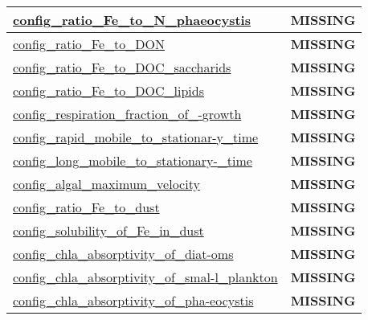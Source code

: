 {\begin{center}
\begin{longtable}{| p{2.0in} || p{4.0in} |}
    \hline
    \hyperref[subsec:nm_sec_config_ratio_Fe_to_N_phaeocystis]{config\_ratio\_Fe\_to\_N\_phaeocystis} & {\bf \color{red} MISSING} \\
    \hline
    \hyperref[subsec:nm_sec_config_ratio_Fe_to_DON]{config\_ratio\_Fe\_to\_DON} & {\bf \color{red} MISSING} \\
    \hline
    \hyperref[subsec:nm_sec_config_ratio_Fe_to_DOC_saccharids]{config\_ratio\_Fe\_to\_DOC\_saccharids} & {\bf \color{red} MISSING} \\
    \hline
    \hyperref[subsec:nm_sec_config_ratio_Fe_to_DOC_lipids]{config\_ratio\_Fe\_to\_DOC\_lipids} & {\bf \color{red} MISSING} \\
    \hline
    \hyperref[subsec:nm_sec_config_respiration_fraction_of_growth]{config\_respiration\_fraction\_of\_-}\hyperref[subsec:nm_sec_config_respiration_fraction_of_growth]{growth}& {\bf \color{red} MISSING} \\
    \hline
    \hyperref[subsec:nm_sec_config_rapid_mobile_to_stationary_time]{config\_rapid\_mobile\_to\_stationar-}\hyperref[subsec:nm_sec_config_rapid_mobile_to_stationary_time]{y\_time}& {\bf \color{red} MISSING} \\
    \hline
    \hyperref[subsec:nm_sec_config_long_mobile_to_stationary_time]{config\_long\_mobile\_to\_stationary-}\hyperref[subsec:nm_sec_config_long_mobile_to_stationary_time]{\_time}& {\bf \color{red} MISSING} \\
    \hline
    \hyperref[subsec:nm_sec_config_algal_maximum_velocity]{config\_algal\_maximum\_velocity} & {\bf \color{red} MISSING} \\
    \hline
    \hyperref[subsec:nm_sec_config_ratio_Fe_to_dust]{config\_ratio\_Fe\_to\_dust} & {\bf \color{red} MISSING} \\
    \hline
    \hyperref[subsec:nm_sec_config_solubility_of_Fe_in_dust]{config\_solubility\_of\_Fe\_in\_dust} & {\bf \color{red} MISSING} \\
    \hline
    \hyperref[subsec:nm_sec_config_chla_absorptivity_of_diatoms]{config\_chla\_absorptivity\_of\_diat-}\hyperref[subsec:nm_sec_config_chla_absorptivity_of_diatoms]{oms}& {\bf \color{red} MISSING} \\
    \hline
    \hyperref[subsec:nm_sec_config_chla_absorptivity_of_small_plankton]{config\_chla\_absorptivity\_of\_smal-}\hyperref[subsec:nm_sec_config_chla_absorptivity_of_small_plankton]{l\_plankton}& {\bf \color{red} MISSING} \\
    \hline
    \hyperref[subsec:nm_sec_config_chla_absorptivity_of_phaeocystis]{config\_chla\_absorptivity\_of\_pha-}\hyperref[subsec:nm_sec_config_chla_absorptivity_of_phaeocystis]{eocystis}& {\bf \color{red} MISSING} \\

\end{longtable}
\end{center}}
